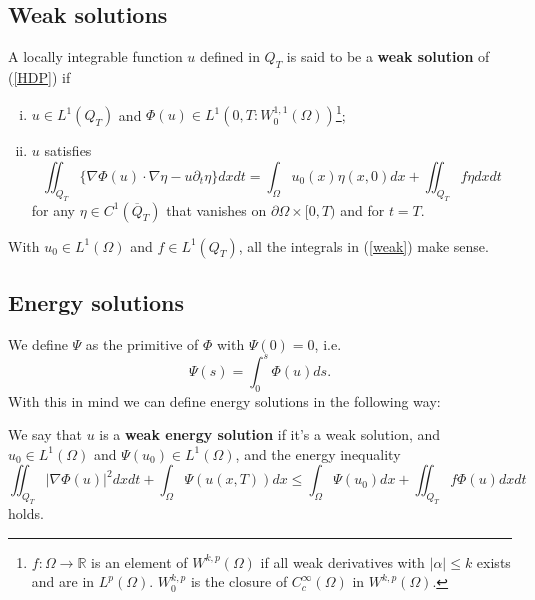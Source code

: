 \documentclass[11pt, a4paper]{article}
\begin{document}
\subsection{Weak solutions}
\begin{mydef}
A locally integrable function $u$ defined in $Q_T$ is said to be a \textbf{weak solution} of (\ref{HDP}) if
\begin{enumerate}[i)]
	\item $u \in L^1(Q_T)$ and $\Phi(u) \in L^1(0,T : W_0^{1,1}(\Omega))$\footnote{$f:\Omega \to \mathbb{R}$ is an element of $W^{k,p}(\Omega)$ if all weak derivatives with $|\alpha| \leq k$ exists and are in $L^p(\Omega)$. $W_0^{k,p}$ is the closure of $C^\infty_c(\Omega)$ in $W^{k,p}(\Omega)$.};
	\item $u$ satisfies
		\begin{equation}
		\label{weak}
		\iint_{Q_T} \{\nabla\Phi(u)\cdot \nabla\eta - u\partial_t \eta \}dxdt = \int_\Omega u_0(x)\eta(x,0)dx + \iint_{Q_T}f\eta dxdt
		\end{equation}
for any $\eta \in C^1(\overline{Q}_T)$ that vanishes on $\partial \Omega \times [0,T)$ and for $t=T$.
\end{enumerate}
\end{mydef}

\begin{obs}
With $u_0 \in L^1(\Omega)$ and $f\in L^1(Q_T)$, all the integrals in (\ref{weak}) make sense.
\end{obs}

\subsection{Energy solutions}
We define  $\Psi$ as the primitive of $\Phi$ with $\Psi(0) = 0$, i.e.
\begin{equation*}
	\Psi(s) = \int_0^s \Phi(u) ds.
\end{equation*}
With this in mind we can define energy solutions in the following way:
\begin{mydef}
We say that $u$ is a \textbf{weak energy solution} if it's a weak solution, and $u_0 \in L^1(\Omega)$ and $\Psi(u_0) \in L^1(\Omega)$, and the energy inequality
\begin{equation}
\label{energy_ineq}
\iint_{Q_T} |\nabla \Phi(u)|^2 dxdt + \int_\Omega \Psi(u(x,T))dx \leq \int_\Omega \Psi(u_0)dx + \iint_{Q_T}f\Phi(u)dxdt
\end{equation}
holds.
\end{mydef}
\end{document}
